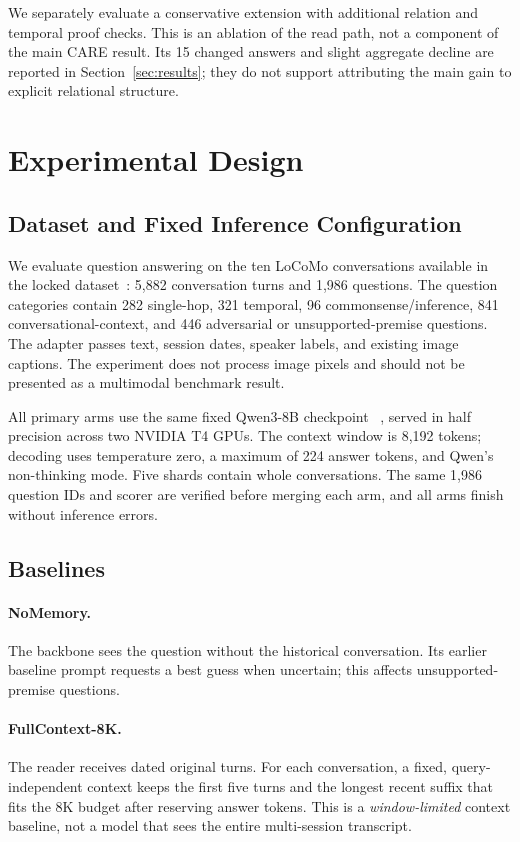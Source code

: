 \documentclass[11pt]{article}
\newcommand{\care}{\textsc{CARE}}
\begin{document}
We separately evaluate a conservative extension with additional relation
and temporal proof checks. This is an ablation of the read path, not a
component of the main \care{} result. Its 15 changed answers and slight
aggregate decline are reported in Section~\ref{sec:results}; they do not
support attributing the main gain to explicit relational structure.

\section{Experimental Design}
\label{sec:experiments}

\subsection{Dataset and Fixed Inference Configuration}

We evaluate question answering on the ten LoCoMo conversations available in
the locked dataset~\cite{maharana2024locomo}: 5,882 conversation turns and
1,986 questions. The question categories contain 282 single-hop, 321
temporal, 96 commonsense/inference, 841 conversational-context, and 446
adversarial or unsupported-premise questions. The adapter passes text,
session dates, speaker labels, and existing image captions. The experiment
does not process image pixels and should not be presented as a multimodal
benchmark result.

All primary arms use the same fixed Qwen3-8B checkpoint
~\cite{yang2025qwen3}, served in half precision across two NVIDIA T4 GPUs.
The context window is 8,192 tokens; decoding
uses temperature zero, a maximum of 224 answer tokens, and Qwen's
non-thinking mode. Five shards contain whole conversations. The same 1,986
question IDs and scorer are verified before merging each arm, and all arms
finish without inference errors.

\subsection{Baselines}

\paragraph{NoMemory.} The backbone sees the question without the historical
conversation. Its earlier baseline prompt requests a best guess when
uncertain; this affects unsupported-premise questions.

\paragraph{FullContext-8K.} The reader receives dated original turns. For
each conversation, a fixed, query-independent context keeps the first five
turns and the longest recent suffix that fits the 8K budget after reserving
answer tokens. This is a \emph{window-limited} context baseline, not a model
that sees the entire multi-session transcript.
\end{document}
